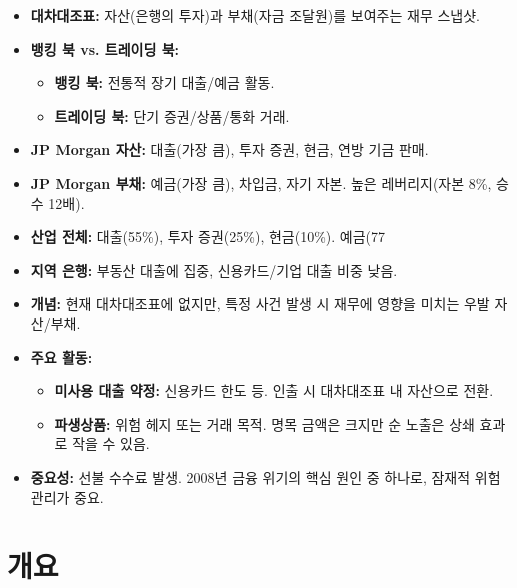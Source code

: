 \documentclass[11pt,a4paper]{book}
\theoremstyle{definition}
\begin{document}
\begin{tcolorbox}[title={\textbf{현대 은행의 재무제표 분석}}]
\begin{itemize}
    \item \textbf{대차대조표:} 자산(은행의 투자)과 부채(자금 조달원)를 보여주는 재무 스냅샷.
    \item \textbf{뱅킹 북 vs. 트레이딩 북:}
    \begin{itemize}
        \item \textbf{뱅킹 북:} 전통적 장기 대출/예금 활동.
        \item \textbf{트레이딩 북:} 단기 증권/상품/통화 거래.
    \end{itemize}
    \item \textbf{JP Morgan 자산:} 대출(가장 큼), 투자 증권, 현금, 연방 기금 판매.
    \item \textbf{JP Morgan 부채:} 예금(가장 큼), 차입금, 자기 자본. 높은 레버리지(자본 8\%, 승수 12배).
    \item \textbf{산업 전체:} 대출(55\%), 투자 증권(25\%), 현금(10\%). 예금(77%
    \item \textbf{지역 은행:} 부동산 대출에 집중, 신용카드/기업 대출 비중 낮음.
\end{itemize}
\end{tcolorbox}

\begin{tcolorbox}[title={\textbf{대차대조표 외 활동 (OBS)}}]
\begin{itemize}
    \item \textbf{개념:} 현재 대차대조표에 없지만, 특정 사건 발생 시 재무에 영향을 미치는 우발 자산/부채.
    \item \textbf{주요 활동:}
    \begin{itemize}
        \item \textbf{미사용 대출 약정:} 신용카드 한도 등. 인출 시 대차대조표 내 자산으로 전환.
        \item \textbf{파생상품:} 위험 헤지 또는 거래 목적. 명목 금액은 크지만 순 노출은 상쇄 효과로 작을 수 있음.
    \end{itemize}
    \item \textbf{중요성:} 선불 수수료 발생. 2008년 금융 위기의 핵심 원인 중 하나로, 잠재적 위험 관리가 중요.
\end{itemize}
\end{tcolorbox}


\section{개요}
\end{document}
